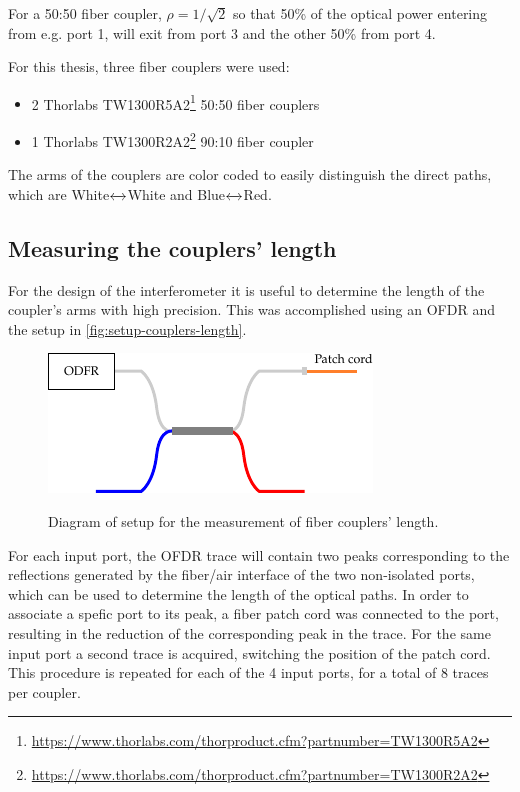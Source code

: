 For a 50:50 fiber coupler, $\rho = 1/\sqrt{2}$ so that 50\% of the optical power entering from e.g. port 1, will exit from port 3 and the other 50\% from port 4. 

For this thesis, three fiber couplers were used:
\begin{itemize}
	\item 2 Thorlabs TW1300R5A2\footnote{\url{https://www.thorlabs.com/thorproduct.cfm?partnumber=TW1300R5A2}} 50:50 fiber couplers
	\item 1 Thorlabs TW1300R2A2\footnote{\url{https://www.thorlabs.com/thorproduct.cfm?partnumber=TW1300R2A2}} 90:10 fiber coupler	
\end{itemize} 
The arms of the couplers are color coded to easily distinguish the direct paths, which are White$\xleftrightarrow{}$White and Blue$\xleftrightarrow{}$Red.

\subsection{Measuring the couplers' length}
For the design of the interferometer it is useful to determine the length of the coupler's arms with high precision. This was accomplished using an \acf{OFDR} and the setup in \autoref{fig:setup-couplers-length}. 


\begin{figure}[bth]
	\myfloatalign
	{\includegraphics[width=0.5\linewidth]{gfx/ch3/couplers/setup-misura-lunghezza.pdf}}
	\caption{Diagram of setup for the measurement of fiber couplers' length.}\label{fig:setup-couplers-length}
\end{figure}


For each input port, the \ac{OFDR} trace will contain two peaks corresponding to the reflections generated by the fiber/air interface of the two non-isolated ports, which can be used to determine the length of the optical paths. In order to associate a spefic port to its peak, a fiber patch cord was connected to the port, resulting in the reduction of the corresponding peak in the trace. For the same input port a second trace is acquired, switching the position of the patch cord. This procedure is repeated for each of the 4 input ports, for a total of $8$ traces per coupler. 

